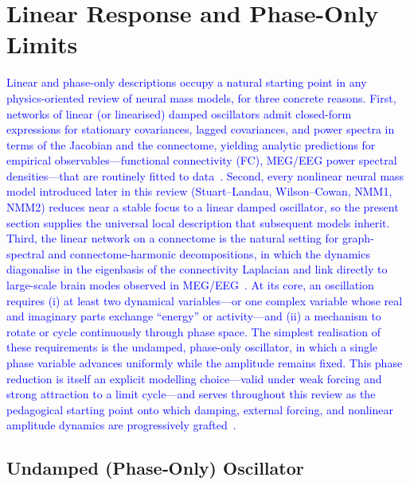 \documentclass[12pt]{article}
\numberwithin{equation}{section}
\newcommand{\rev}[1]{\textcolor{blue}{#1}}
\begin{document}
\section{Linear Response and Phase-Only Limits}
\label{sec:linear-phase}
\label{sec:ho}
\rev{Linear and phase-only descriptions occupy a natural starting point in any physics-oriented review of neural mass models, for three concrete reasons. First, networks of linear (or linearised) damped oscillators admit closed-form expressions for stationary covariances, lagged covariances, and power spectra in terms of the Jacobian and the connectome, yielding analytic predictions for empirical observables---functional connectivity (FC), MEG/EEG power spectral densities---that are routinely fitted to data~\cite{PonceAlvarez2024HopfLinear,Gilson2016}. Second, every nonlinear neural mass model introduced later in this review (Stuart--Landau, Wilson--Cowan, NMM1, NMM2) reduces near a stable focus to a linear damped oscillator, so the present section supplies the universal local description that subsequent models inherit. Third, the linear network on a connectome is the natural setting for graph-spectral and connectome-harmonic decompositions, in which the dynamics diagonalise in the eigenbasis of the connectivity Laplacian and link directly to large-scale brain modes observed in MEG/EEG~\cite{atasoyConnectomeharmonicDecompositionHuman2017a}. At its core, an oscillation requires (i) at least two dynamical variables---or one complex variable whose real and imaginary parts exchange ``energy'' or activity---and (ii) a mechanism to rotate or cycle continuously through phase space. The simplest realisation of these requirements is the undamped, phase-only oscillator, in which a single phase variable advances uniformly while the amplitude remains fixed. This phase reduction is itself an explicit modelling choice---valid under weak forcing and strong attraction to a limit cycle---and serves throughout this review as the pedagogical starting point onto which damping, external forcing, and nonlinear amplitude dynamics are progressively grafted~\cite{Strogatz2018,Winfree2001}.}


\subsection{Undamped (Phase‐Only) Oscillator}
\end{document}
